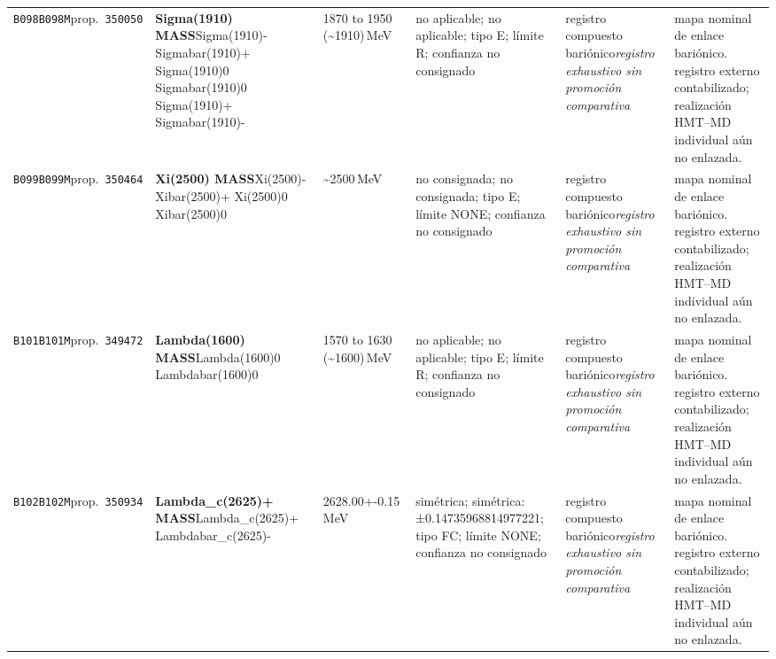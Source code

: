 \begin{landscape}
\begin{longtable}{L{1.85cm}L{4.45cm}L{2.35cm}L{4.05cm}L{3.35cm}L{7.15cm}}
\texttt{B098}\newline \texttt{B098M}\newline prop.\ \texttt{350050} & \textbf{Sigma(1910) MASS}\newline Sigma(1910)- \textbar{}\allowbreak{} Sigmabar(1910)+ \textbar{}\allowbreak{} Sigma(1910)0 \textbar{}\allowbreak{} Sigmabar(1910)0 \textbar{}\allowbreak{} Sigma(1910)+ \textbar{}\allowbreak{} Sigmabar(1910)- & 1870 to 1950 (\textasciitilde{}1910)\,MeV & no aplicable; no aplicable; tipo E; límite R; confianza no consignado & registro compuesto bariónico\newline \emph{registro exhaustivo sin promoción comparativa} & mapa nominal de enlace bariónico. registro externo contabilizado; realización HMT--MD individual aún no enlazada. \\
\texttt{B099}\newline \texttt{B099M}\newline prop.\ \texttt{350464} & \textbf{Xi(2500) MASS}\newline Xi(2500)- \textbar{}\allowbreak{} Xibar(2500)+ \textbar{}\allowbreak{} Xi(2500)0 \textbar{}\allowbreak{} Xibar(2500)0 & \textasciitilde{}2500\,MeV & no consignada; no consignada; tipo E; límite NONE; confianza no consignado & registro compuesto bariónico\newline \emph{registro exhaustivo sin promoción comparativa} & mapa nominal de enlace bariónico. registro externo contabilizado; realización HMT--MD individual aún no enlazada. \\
\texttt{B101}\newline \texttt{B101M}\newline prop.\ \texttt{349472} & \textbf{Lambda(1600) MASS}\newline Lambda(1600)0 \textbar{}\allowbreak{} Lambdabar(1600)0 & 1570 to 1630 (\textasciitilde{}1600)\,MeV & no aplicable; no aplicable; tipo E; límite R; confianza no consignado & registro compuesto bariónico\newline \emph{registro exhaustivo sin promoción comparativa} & mapa nominal de enlace bariónico. registro externo contabilizado; realización HMT--MD individual aún no enlazada. \\
\texttt{B102}\newline \texttt{B102M}\newline prop.\ \texttt{350934} & \textbf{Lambda\_\allowbreak{}c(2625)+ MASS}\newline Lambda\_\allowbreak{}c(2625)+ \textbar{}\allowbreak{} Lambdabar\_\allowbreak{}c(2625)- & 2628.00+-0.15\,MeV & simétrica; simétrica: ±0.14735968814977221; tipo FC; límite NONE; confianza no consignado & registro compuesto bariónico\newline \emph{registro exhaustivo sin promoción comparativa} & mapa nominal de enlace bariónico. registro externo contabilizado; realización HMT--MD individual aún no enlazada. \\

\end{longtable}
\end{landscape}
